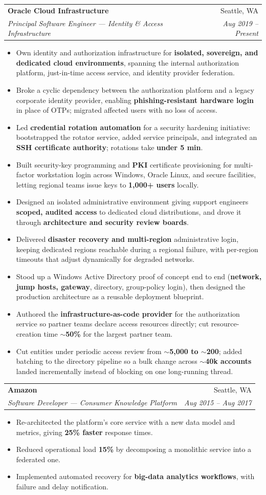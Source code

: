 \documentclass[letterpaper,11pt]{article}
\makeatletter
\newcommand{\resumeItem}[1]{
  \item\small{
    {#1 \vspace{-2pt}}
  }
}
\newcommand{\resumeSubheading}[4]{
  \vspace{-2pt}\item
    \begin{tabular*}{0.97\textwidth}[t]{l@{\extracolsep{\fill}}r}
      \textbf{#1} & #2 \\
      \textit{\small#3} & \textit{\small #4} \\
    \end{tabular*}\vspace{-7pt}
}
\newcommand{\resumeItemListStart}{\begin{itemize}}
\newcommand{\resumeItemListEnd}{\end{itemize}\vspace{-5pt}}
\makeatother
\begin{document}
    \resumeSubheading
      {Oracle Cloud Infrastructure}{Seattle, WA}
      {Principal Software Engineer --- Identity \& Access Infrastructure}{Aug 2019 -- Present}
      \resumeItemListStart
        \resumeItem{Own identity and authorization infrastructure for \textbf{isolated, sovereign, and dedicated cloud environments}, spanning the internal authorization platform, just-in-time access service, and identity provider federation.}
        \resumeItem{Broke a cyclic dependency between the authorization platform and a legacy corporate identity provider, enabling \textbf{phishing-resistant hardware login} in place of OTPs; migrated affected users with no loss of access.}
        \resumeItem{Led \textbf{credential rotation automation} for a security hardening initiative: bootstrapped the rotator service, added service principals, and integrated an \textbf{SSH certificate authority}; rotations take \textbf{under 5 min}.}
        \resumeItem{Built security-key programming and \textbf{PKI} certificate provisioning for multi-factor workstation login across Windows, Oracle Linux, and secure facilities, letting regional teams issue keys to \textbf{1,000+ users} locally.}
        \resumeItem{Designed an isolated administrative environment giving support engineers \textbf{scoped, audited access} to dedicated cloud distributions, and drove it through \textbf{architecture and security review boards}.}
        \resumeItem{Delivered \textbf{disaster recovery and multi-region} administrative login, keeping dedicated regions reachable during a regional failure, with per-region timeouts that adjust dynamically for degraded networks.}
        \resumeItem{Stood up a Windows Active Directory proof of concept end to end (\textbf{network, jump hosts, gateway}, directory, group-policy login), then designed the production architecture as a reusable deployment blueprint.}
        \resumeItem{Authored the \textbf{infrastructure-as-code provider} for the authorization service so partner teams declare access resources directly; cut resource-creation time \textbf{$\sim$50\%} for the largest partner team.}
        \resumeItem{Cut entities under periodic access review from \textbf{$\sim$5,000 to $\sim$200}; added batching to the directory pipeline so a bulk change across \textbf{$\sim$40k accounts} landed incrementally instead of blocking on one long-running thread.}
      \resumeItemListEnd

    \resumeSubheading
      {Amazon}{Seattle, WA}
      {Software Developer --- Consumer Knowledge Platform}{Aug 2015 -- Aug 2017}
      \resumeItemListStart
        \resumeItem{Re-architected the platform's core service with a new data model and metrics, giving \textbf{25\% faster} response times.}
        \resumeItem{Reduced operational load \textbf{15\%} by decomposing a monolithic service into a federated one.}
        \resumeItem{Implemented automated recovery for \textbf{big-data analytics workflows}, with failure and delay notification.}
      \resumeItemListEnd
\end{document}

